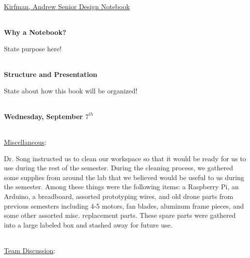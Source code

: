 \documentclass[12pt]{extarticle}
\newenvironment{myindentpar}[1]%
 {\begin{list}{}%
         {\setlength{\leftmargin}{#1}}%
         \item[]%
 }
 {\end{list}}
\begin{document}
\begin{center}
    {\large \underline{Kirfman, Andrew Senior Design Notebook}}
\end{center}

\ \\
\textbf{Why a Notebook?}

\begin{myindentpar}{6.5mm}

    \noindent
    State purpose here!

\end{myindentpar}

\ \\
\textbf{Structure and Presentation}

\begin{myindentpar}{6.5mm}

    \noindent
    State about how this book will be organized!

\end{myindentpar}


\ \\
\textbf{Wednesday, September $7^{th}$}

\ \\
\underline{Miscellaneous}:

\begin{myindentpar}{6.5mm}

    \noindent
    Dr. Song instructed us to clean our workspace so that it would be ready for us to use during the rest of the semester.  During the cleaning process, we gathered some supplies from around the lab that we believed would be useful to us during the semester.  Among these things were the following items: a Raspberry Pi, an Arduino, a breadboard, assorted prototyping wires, and old drone parts from previous semesters including 4-5 motors, fan blades, aluminum frame pieces, and some other assorted misc. replacement parts.  These spare parts were gathered into a large labeled box and stashed away for future use.  

\end{myindentpar}

\vspace{-3mm}
\ \\
\underline{Team Discussion}:
\end{document}
